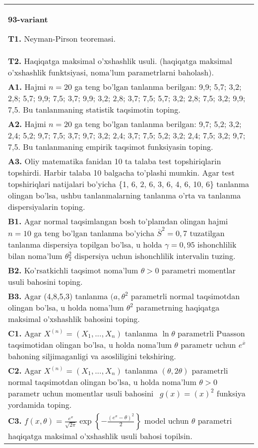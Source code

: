 \documentclass{article}
\begin{document}
\begin{tabular}{m{17cm}}
\textbf{93-variant}
\newline

\textbf{T1.} 
Neyman-Pirson teoremasi.
\\
\textbf{T2.} 
Haqiqatga maksimal o'xshashlik usuli. (haqiqatga maksimal o'xshashlik funktsiyasi, noma'lum parametrlarni baholash).
\\
\textbf{A1.} 
Hajmi \(n = 20\) ga teng bo'lgan tanlanma berilgan: 9,9; 5,7; 3,2; 2,8; 5,7; 9,9; 7,5; 3,7; 9,9; 3,2; 2,8; 3,7; 7,5; 5,7; 3,2; 2,8; 7,5; 3,2; 9,9; 7,5. Bu tanlanmaning statistik taqsimotin toping.
\\
\textbf{A2.} 
Hajmi \(n = 20\) ga teng bo'lgan tanlanma berilgan: 9,7; 5,2; 3,2; 2,4; 5,2; 9,7; 7,5; 3,7; 9,7; 3,2; 2,4; 3,7; 7,5; 5,2; 3,2; 2,4; 7,5; 3,2; 9,7; 7,5. Bu tanlanmaning empirik taqsimot funksiyasin toping.
\\
\textbf{A3.} 
Oliy matematika fanidan 10 ta talaba test topshiriqlarin topshirdi. Harbir talaba 10 balgacha to'plashi mumkin. Agar test topshiriqlari natijalari bo'yicha \{1, 6, 2, 6, 3, 6, 4, 6, 10, 6\} tanlanma olingan bo'lsa, ushbu tanlanmalarning tanlanma o'rta va tanlanma dispersiyalarin toping.
\\
\textbf{B1.} 
Agar normal taqsimlangan bosh to'plamdan olingan hajmi \(n = 10\) ga teng bo'lgan tanlanma bo'yicha \({\overline{S}}^{2} = 0,7\) tuzatilgan tanlanma dispersiya topilgan bo'lsa, u holda \(\gamma = 0,95\) ishonchlilik bilan noma'lum \(\theta_{2}^{2}\) dispersiya uchun ishonchlilik intervalin tuzing.
\\
\textbf{B2.} 
Ko'rsatkichli taqsimot noma'lum \(\theta > 0\) parametri momentlar usuli bahosini toping.
\\
\textbf{B3.} 
Agar (4,8,5,3) tanlanma \((a,\theta^{2}\) parametrli normal taqsimotdan olingan bo'lsa, u holda noma'lum \(\theta^{2}\) parametrning haqiqatga maksimal o'xshashlik bahosini toping.
\\
\textbf{C1.} 
Agar \(X^{(n)} = \left( X_{1},...,X_{n} \right)\) tanlanma \(\ln\theta\) parametrli Puasson taqsimotidan olingan bo'lsa, u holda noma'lum \(\theta\) parametr uchun \(e^{\overline{x}}\) bahoning siljimaganligi va asosliligini tekshiring.
\\
\textbf{C2.} 
Agar \(X^{(n)} = \left( X_{1},...,X_{n} \right)\) tanlanma \((\theta,2\theta)\) parametrli normal taqsimotdan olingan bo'lsa, u holda noma'lum \(\theta > 0\) parametr uchun momentlar usuli bahosini \(\ \ g(x) = (x)^{2}\) funksiya yordamida toping.
\\
\textbf{C3.} 
\(f(x,\theta) = \frac{e^{x}}{\sqrt{2\pi}}\exp\left\{ - \frac{\left( e^{x} - \theta \right)^{2}}{2} \right\}\) model uchun \(\theta\) parametri haqiqatga maksimal o'xshashlik usuli bahosi topilsin.
\\

\end{tabular}
\vspace{1cm}
\end{document}
